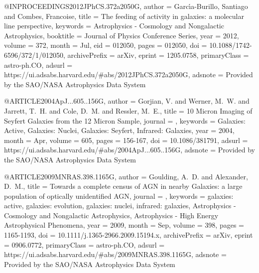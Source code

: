 \documentclass[longauth]{aa}
\begin{document}
@INPROCEEDINGS{2012JPhCS.372a2050G,
       author = {{Garc{\'\i}a-Burillo}, Santiago and {Combes}, Francoise},
        title = {The feeding of activity in galaxies: a molecular line perspective},
     keywords = {Astrophysics - Cosmology and Nongalactic Astrophysics},
    booktitle = {Journal of Physics Conference Series},
         year = 2012,
       volume = {372},
        month = Jul,
          eid = {012050},
        pages = {012050},
          doi = {10.1088/1742-6596/372/1/012050},
archivePrefix = {arXiv},
       eprint = {1205.0758},
 primaryClass = {astro-ph.CO},
       adsurl = {https://ui.adsabs.harvard.edu/#abs/2012JPhCS.372a2050G},
      adsnote = {Provided by the SAO/NASA Astrophysics Data System}
}

@ARTICLE{2004ApJ...605..156G,
       author = {{Gorjian}, V. and {Werner}, M.~W. and {Jarrett}, T.~H. and {Cole}, D.~M. and {Ressler}, M.~E.},
        title = {10 Micron Imaging of Seyfert Galaxies from the 12 Micron Sample},
      journal = {\apj},
     keywords = {Galaxies: Active, Galaxies: Nuclei, Galaxies: Seyfert, Infrared: Galaxies},
         year = 2004,
        month = Apr,
       volume = {605},
        pages = {156-167},
          doi = {10.1086/381791},
       adsurl = {https://ui.adsabs.harvard.edu/#abs/2004ApJ...605..156G},
      adsnote = {Provided by the SAO/NASA Astrophysics Data System}
}

@ARTICLE{2009MNRAS.398.1165G,
       author = {{Goulding}, A.~D. and {Alexander}, D.~M.},
        title = {Towards a complete census of AGN in nearby Galaxies: a large population of optically unidentified AGN},
      journal = {\mnras},
     keywords = {galaxies: active, galaxies: evolution, galaxies: nuclei, infrared: galaxies, Astrophysics - Cosmology and Nongalactic Astrophysics, Astrophysics - High Energy Astrophysical Phenomena},
         year = 2009,
        month = Sep,
       volume = {398},
        pages = {1165-1193},
          doi = {10.1111/j.1365-2966.2009.15194.x},
archivePrefix = {arXiv},
       eprint = {0906.0772},
 primaryClass = {astro-ph.CO},
       adsurl = {https://ui.adsabs.harvard.edu/#abs/2009MNRAS.398.1165G},
      adsnote = {Provided by the SAO/NASA Astrophysics Data System}
}
\end{document}
